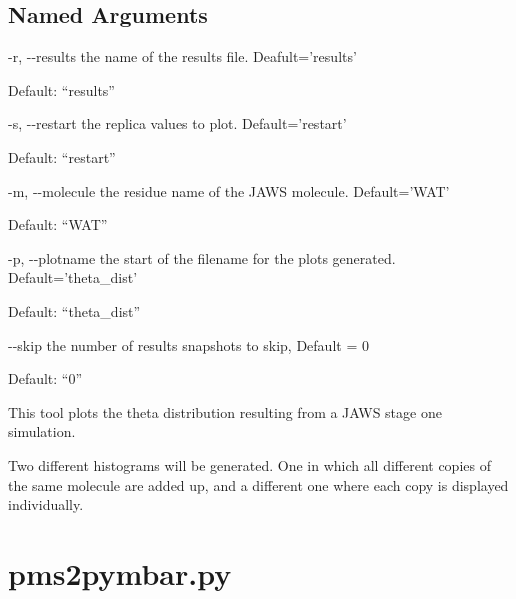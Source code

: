 \documentclass[letterpaper,10pt,english]{sphinxmanual}
\begin{document}
\subsection{Named Arguments}
\label{\detokenize{tools:Named Arguments}}\begin{optionlist}{3cm}
\item [-r, -{-}results]  
the name of the results file. Deafult=’results’

Default: “results”
\item [-s, -{-}restart]  
the replica values to plot. Default=’restart’

Default: “restart”
\item [-m, -{-}molecule]  
the residue name of the JAWS molecule. Default=’WAT’

Default: “WAT”
\item [-p, -{-}plotname]  
the start of the filename for the plots generated. Default=’theta\_dist’

Default: “theta\_dist”
\item [-{-}skip]  
the number of results snapshots to skip, Default = 0

Default: “0”
\end{optionlist}


%
\begin{sphinxVerbatim}[commandchars=\\\{\}]
    
    
\end{sphinxVerbatim}


This tool plots the theta distribution resulting from a JAWS stage one simulation.

Two different histograms will be generated. One in which all different copies of the same molecule are added up, and a different one where each copy is displayed individually.


\section{pms2pymbar.py}
\label{\detokenize{tools:pms2pymbar-py}}
\end{document}
